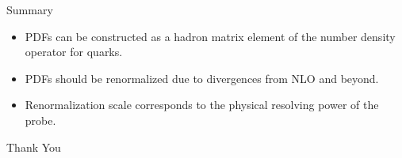 \documentclass[aspectratio=169,xcolor=dvipsnames]{beamer}
\newcommand*\dif{\mathop{}\!\mathrm{d}}
\begin{document}
%
%	



\begin{frame}{Summary}
	\begin{itemize}
		\item PDFs can be constructed as a hadron matrix
		element of the number density operator for quarks.
		\item PDFs should be renormalized due to divergences from NLO and beyond.
		\item Renormalization scale corresponds to the physical resolving power of the probe.
	\end{itemize}
\end{frame}

\begin{frame}
    \Huge{\centerline{Thank You}}
\end{frame}

\end{document}
